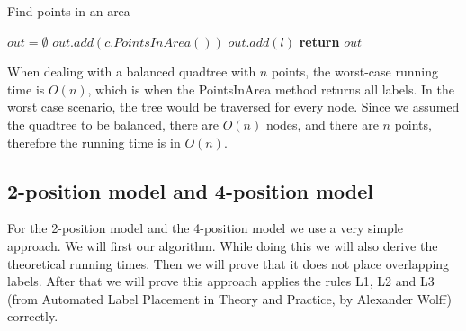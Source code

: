 \documentclass[crop=false,a4paper,oneside,11pt]{article}
\begin{document}
\begin{algorithm}[H]
\caption{Find points in an area}
\begin{algorithmic}[1]
\State $out = \emptyset$
\State $out.add(c.PointsInArea())$
\EndIf
\EndFor
\Else{}
\State $out.add(l)$
\EndIf
\EndFor
\EndIf
\State \textbf{return} $out$
\EndProcedure
\end{algorithmic}
\end{algorithm}

When dealing with a balanced quadtree with $n$ points, the worst-case running time is $O(n)$, which is when the PointsInArea method returns all labels. In the worst case scenario, the tree would be traversed for every node. Since we assumed the quadtree to be balanced, there are $O(n)$ nodes, and there are $n$ points, therefore the running time is in $O(n)$.

\subsection{2-position model and 4-position model}
For the 2-position model and the 4-position model we use a very simple approach. We will first our algorithm. While doing this we will also derive the theoretical running times. Then we will prove that it does not place overlapping labels. After that we will prove this approach applies the rules L1, L2 and L3 (from Automated Label Placement in Theory and Practice, by Alexander Wolff) correctly.
\end{document}
